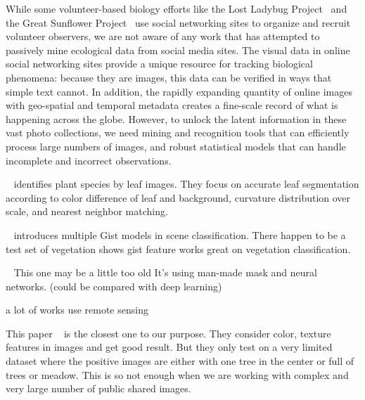 While some volunteer-based biology efforts like the Lost Ladybug
Project~\cite{lostladybug} and the Great Sunflower
Project~\cite{greatsunflower} use social networking sites to
organize and recruit volunteer observers, we are not aware of any
work that has attempted to passively mine ecological data from social media
sites. The visual data in online social networking sites provide a
unique resource for tracking biological phenomena:  because they are
images, this data can be verified in ways that simple text 
cannot.  In addition, the rapidly expanding quantity
of online images with geo-spatial and temporal metadata creates a
fine-scale record of what is happening across the globe.  However, to
unlock the latent information in these vast photo collections, we need
 mining and recognition tools that can efficiently
process large numbers of images, and robust statistical models that
can handle incomplete and incorrect observations.








~\cite{Leafsnap: A Computer Vision System for
Automatic Plant Species Identification} identifies plant species by leaf images. They focus on accurate leaf segmentation according to color difference of leaf and background, curvature distribution over scale, and nearest neighbor matching.

~\cite{Comparisons of Gist Models in Rapid Scene categorization tasks}
introduces multiple Gist models in scene classification. There happen to be a test set of vegetation shows gist feature works great on vegetation classification.

~\cite{Detecting subpixel woody vegetation in digital imagery using two artificial intelligence approaches}
This one may be a little too old
It's using man-made mask and neural networks.
(could be compared with deep learning)

a lot of works use remote sensing 

This paper ~\cite{greenery and non-greenery image classification using adaptive neuro-guzzy inference system}
is the closest one to our purpose.
They consider
color, texture features in images and get good result. But they only test on a very limited dataset where the positive images are either with one tree in the center or full of trees or meadow. This is so not enough when we are working with  complex and very large number of public shared images.

